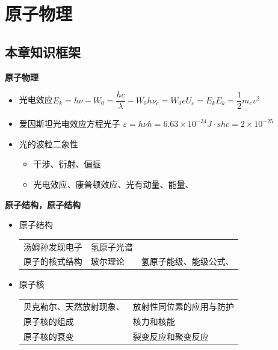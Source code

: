 \chapter{原子物理}
\label{ch:17}

\section{本章知识框架}
\textbf{原子物理}
\begin{itemize}
\item 光电效应\quad $E_k=h\nu-W_0=\dfrac{hc}{\lambda}-W_0$\quad $h\nu_c=W_0$\quad $eU_c=E_k$\quad $E_k=\dfrac12m_ev^2$
\item 爱因斯坦光电效应方程\quad 光子 $\varepsilon=h\nu$\quad $h=6.63\times10^{-34}\unit{J\cdot s}$\quad $hc=2\times10^{-25}$ %
\item 光的波粒二象性
  \begin{itemize}
  \item[$\to$] 干涉、衍射、偏振 %
  \item[$\to$] 光电效应、康普顿效应、光有动量、能量、 %
  \end{itemize}
\end{itemize}

\textbf{原子结构，原子结构} %
\begin{itemize}
\item 原子结构\\
  \begin{tabular}[t]{@{}lll@{}}
  汤姆孙发现电子 & 氢原子光谱 & \\
  原子的核式结构 & 玻尔理论 & 氢原子能级、能级公式、 \\
  \end{tabular}
\item 原子核\\
  \begin{tabular}[t]{@{}ll@{}}
  贝克勒尔、天然放射现象、 & 放射性同位素的应用与防护 \\
  原子核的组成 & 核力和核能 \\
  原子核的衰变 & 裂变反应和聚变反应 \\
  \end{tabular}
\end{itemize}


